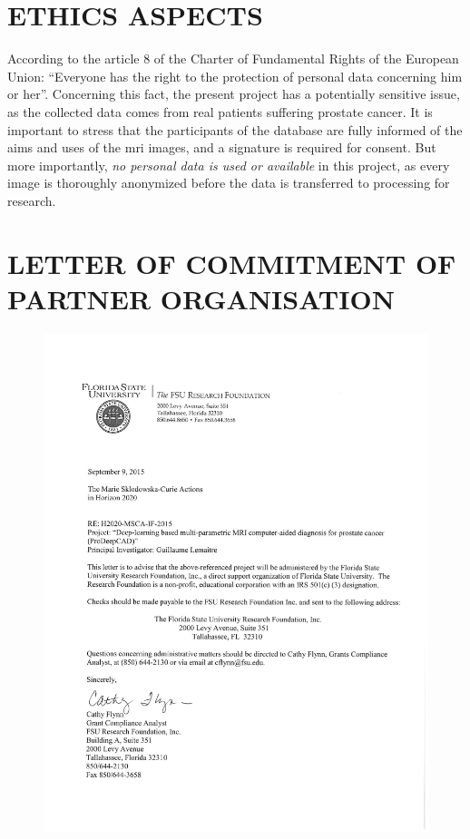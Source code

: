 \section{ETHICS ASPECTS}

According to the article 8 of the Charter of Fundamental Rights of the European Union: ``Everyone has the right to the protection of personal data concerning him or her''. 
Concerning this fact, the present project has a potentially sensitive issue, as the collected data comes from real patients suffering prostate cancer.
It is important to stress that the participants of the database are fully informed of the aims and uses of the \ac{mri} images, and a signature is required for consent.
But more importantly, \emph{no personal data is used or available} in this project, as every image is thoroughly anonymized before the data is transferred to processing for research. 

\newpage

\section{LETTER OF COMMITMENT OF PARTNER ORGANISATION}

\begin{figure}[!h]
  \centering
  \includegraphics[height=.96\textheight]{./content/ethical/lemaitre.pdf}
\end{figure}
